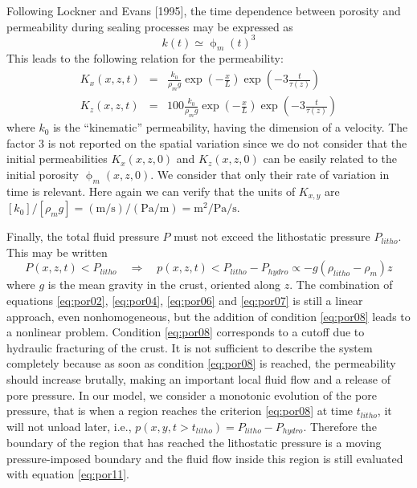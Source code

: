 Following Lockner and Evans [1995], the time
dependence between porosity and permeability during sealing 
processes may be expressed as
\begin{equation}
k(t) \simeq \upphi_m(t)^3
\label{eq:por05}
\end{equation}
This leads to the following relation for the permeability:
\begin{eqnarray}
K_x(x,z,t) &=& \frac{k_0 }{\rho_m g}  \exp\left(-\frac{x}{L}\right) \exp\left(-3\frac{t}{\tau(z)}\right) \label{eq:por06}\\
K_z(x,z,t) &=& 100\frac{k_0 }{\rho_m g}  \exp\left(-\frac{x}{L}\right) \exp\left(-3\frac{t}{\tau(z)}\right)
 \label{eq:por07}
\end{eqnarray}
where $k_0$ is the ``kinematic'' permeability, having the
dimension of a velocity. The factor 3 is not reported on the
spatial variation since we do not consider that the initial
permeabilities $K_x (x, z,0)$ and $K_z (x, z,0)$ can be easily related
to the initial porosity $\upphi_m (x,z,0)$. We consider that only their
rate of variation in time is relevant. 
Here again we can verify that the units of $K_{x,y}$ are 
$[k_0]/[\rho_m g]=(\si{\meter\per\second})/(\si{\pascal}/\si{\meter})
=\si{\square\meter\per\pascal\per\second}$.

Finally, the total fluid pressure $P$ 
must not exceed the lithostatic pressure $P_{litho}$. This may
be written
\begin{equation}
P(x,z,t)<P_{litho} \quad\Rightarrow\quad
p(x,z,t)<P_{litho}-P_{hydro} \propto -g(\rho_{litho}-\rho_m)z
\label{eq:por08}
\end{equation}
where $g$ is the mean gravity in the crust, oriented along $z$.
The combination of equations 
\eqref{eq:por02}, \eqref{eq:por04}, \eqref{eq:por06} and \eqref{eq:por07} is still a
linear approach, even nonhomogeneous, but the addition of
condition \eqref{eq:por08} leads to a nonlinear problem. Condition \eqref{eq:por08}
corresponds to a cutoff due to hydraulic fracturing of the
crust. It is not sufficient to describe the system completely
because as soon as condition \eqref{eq:por08} is reached, the
permeability should increase brutally, making an important
local fluid flow and a release of pore pressure. In our model,
we consider a monotonic evolution of the pore pressure, that
is when a region reaches the criterion \eqref{eq:por08} at time $t_{litho}$, it
will not unload later, i.e., $p(x,y,t > t_{litho}) = P_{litho}-P_{hydro}$.
Therefore the boundary of the region that has reached the
lithostatic pressure is a moving pressure-imposed boundary
and the fluid flow inside this region is still evaluated with
equation \eqref{eq:por11}.

